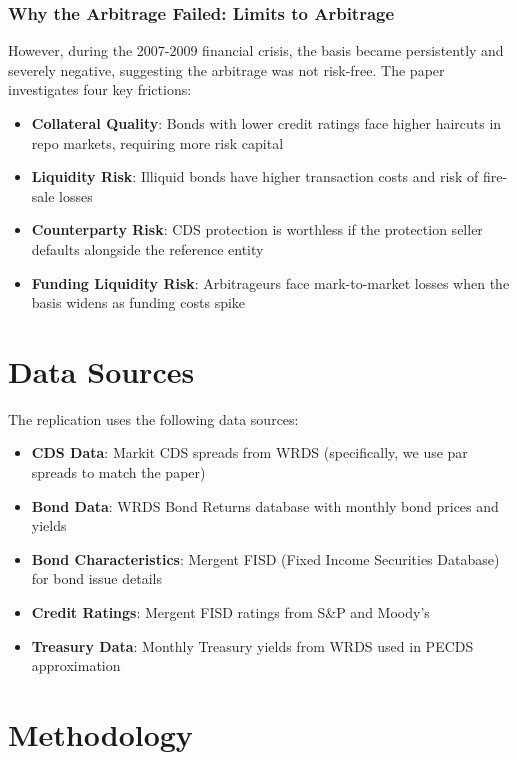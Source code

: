 \documentclass{article}
\begin{document}
\subsubsection{Why the Arbitrage Failed: Limits to Arbitrage}
However, during the 2007-2009 financial crisis, the basis became persistently and severely negative, suggesting the arbitrage was not risk-free. The paper investigates four key frictions:
\begin{itemize}
    \item \textbf{Collateral Quality}: Bonds with lower credit ratings face higher haircuts in repo markets, requiring more risk capital
    \item \textbf{Liquidity Risk}: Illiquid bonds have higher transaction costs and risk of fire-sale losses
    \item \textbf{Counterparty Risk}: CDS protection is worthless if the protection seller defaults alongside the reference entity
    \item \textbf{Funding Liquidity Risk}: Arbitrageurs face mark-to-market losses when the basis widens as funding costs spike
\end{itemize}

\section{Data Sources}

The replication uses the following data sources:

\begin{itemize}
    \item \textbf{CDS Data}: Markit CDS spreads from WRDS (specifically, we use par spreads to match the paper)
    \item \textbf{Bond Data}: WRDS Bond Returns database with monthly bond prices and yields
    \item \textbf{Bond Characteristics}: Mergent FISD (Fixed Income Securities Database) for bond issue details
    \item \textbf{Credit Ratings}: Mergent FISD ratings from S\&P and Moody's
    \item \textbf{Treasury Data}: Monthly Treasury yields from WRDS used in PECDS approximation
\end{itemize}

\section{Methodology}
\end{document}
